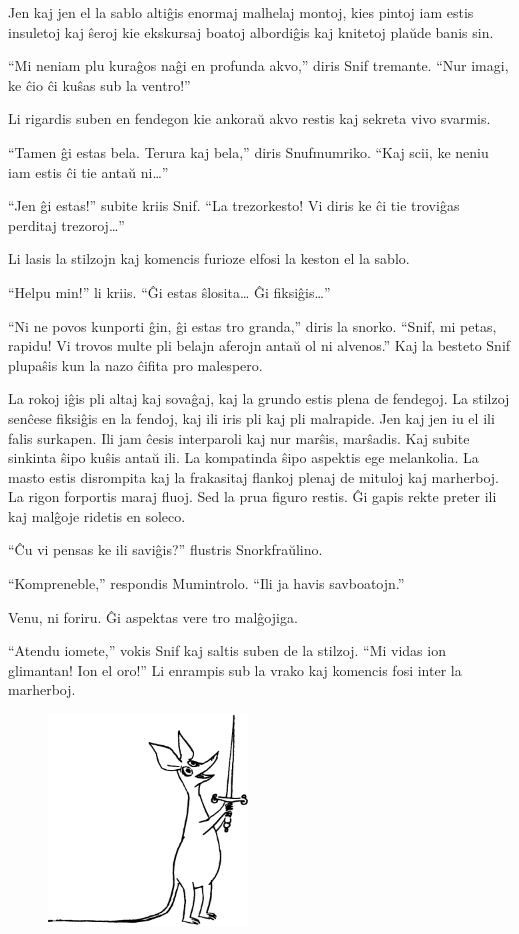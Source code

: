 Jen kaj jen el la sablo altiĝis enormaj malhelaj montoj, kies pintoj iam estis insuletoj kaj ŝeroj kie ekskursaj boatoj albordiĝis kaj knitetoj plaŭde banis sin.

``Mi neniam plu kuraĝos naĝi en profunda akvo,'' diris Snif tremante. ``Nur imagi, ke ĉio ĉi kuŝas sub la ventro!''

Li rigardis suben en fendegon kie ankoraŭ akvo restis kaj sekreta vivo svarmis.

``Tamen ĝi estas bela. Terura kaj bela,'' diris Snufmumriko. ``Kaj scii, ke neniu iam estis ĉi tie antaŭ ni{\ldots}''

``Jen ĝi estas!'' subite kriis Snif. ``La trezorkesto! Vi diris ke ĉi tie troviĝas perditaj trezoroj{\ldots}''

Li lasis la stilzojn kaj komencis furioze elfosi la keston el la sablo.

``Helpu min!'' li kriis. ``Ĝi estas ŝlosita{\ldots} Ĝi fiksiĝis{\ldots}''

``Ni ne povos kunporti ĝin, ĝi estas tro granda,'' diris la snorko. ``Snif, mi petas, rapidu! Vi trovos multe pli belajn aferojn antaŭ ol ni alvenos.'' Kaj la besteto Snif plupaŝis kun la nazo ĉifita pro malespero.

La rokoj iĝis pli altaj kaj sovaĝaj, kaj la grundo estis plena de fendegoj. La stilzoj senĉese fiksiĝis en la fendoj, kaj ili iris pli kaj pli malrapide. Jen kaj jen iu el ili falis surkapen. Ili jam ĉesis interparoli kaj nur marŝis, marŝadis. Kaj subite sinkinta ŝipo kuŝis antaŭ ili. La kompatinda ŝipo aspektis ege melankolia. La masto estis disrompita kaj la frakasitaj flankoj plenaj de mituloj kaj marherboj. La rigon forportis maraj fluoj. Sed la prua figuro restis. Ĝi gapis rekte preter ili kaj malĝoje ridetis en soleco.

``Ĉu vi pensas ke ili saviĝis?'' flustris Snorkfraŭlino.

``Kompreneble,'' respondis Mumintrolo. ``Ili ja havis savboatojn.''

Venu, ni foriru. Ĝi aspektas vere tro malĝojiga.

``Atendu iomete,'' vokis Snif kaj saltis suben de la stilzoj. ``Mi vidas ion glimantan! Ion el oro!'' Li enrampis sub la vrako kaj komencis fosi inter la marherboj.

\begin{figure}[htbp]
\centering
\includegraphics[width=150pt,height=159pt]{7-5.png}
\caption{}
\label{7-5}
\end{figure}

